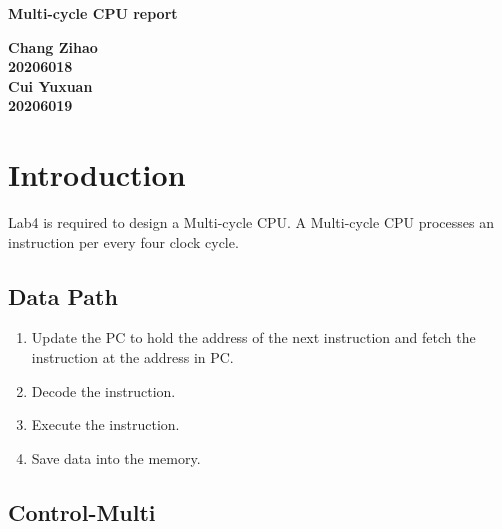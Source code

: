 \documentclass[12pt,a4paper]{article}
\begin{document}
\begin{titlepage}
  \begin{center}
    \vspace*{1cm}

    \textbf{\Huge Multi-cycle CPU  report}

    \vspace{0.5cm}

         
    \vspace{1.5cm}

    \textbf{\large Chang Zihao \\20206018\\\large Cui Yuxuan\\20206019}

    \vfill
         

         
    \vspace{0.8cm}
  


         
\end{center}
\end{titlepage}


\newpage
\tableofcontents
\thispagestyle{empty}

\newpage
{}
\setcounter{page}{1}

\section{Introduction}

Lab4 is required to design a Multi-cycle CPU.
A Multi-cycle CPU processes an instruction per every four clock cycle.

\subsection{Data Path}

\begin{enumerate}
\item Update the PC to hold the address of the next instruction and fetch the instruction at the address in PC.
\item Decode the instruction.
\item Execute the instruction.
\item Save data into the memory.
\end{enumerate}

\subsection{Control-Multi}
\end{document}
